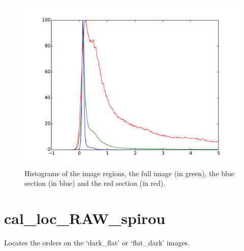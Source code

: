 \begin{figure}
\begin{center}
\includegraphics[width=.8\textwidth]{figures/cal_DARK_spirou_3.pdf}
\caption{Histograms of the image regions, the full image (in green), the blue section (in blue) and the red section (in red).\label{figure:cal_DARK_spirou_3}}
\end{center}
\end{figure}

\clearpage
\newpage
\section{cal\_loc\_RAW\_spirou}
\label{section:cal_loc_RAW_spirou}

Locates the orders on the `dark\_flat' or `flat\_dark' images.\\


